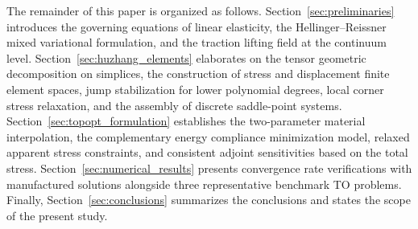 The remainder of this paper is organized as follows. Section~\ref{sec:preliminaries} introduces the governing equations of linear elasticity, the Hellinger--Reissner mixed variational formulation, and the traction lifting field at the continuum level. Section~\ref{sec:huzhang_elements} elaborates on the tensor geometric decomposition on simplices, the construction of stress and displacement finite element spaces, jump stabilization for lower polynomial degrees, local corner stress relaxation, and the assembly of discrete saddle-point systems. Section~\ref{sec:topopt_formulation} establishes the two-parameter material interpolation, the complementary energy compliance minimization model, relaxed apparent stress constraints, and consistent adjoint sensitivities based on the total stress. Section~\ref{sec:numerical_results} presents convergence rate verifications with manufactured solutions alongside three representative benchmark TO problems. Finally, Section~\ref{sec:conclusions} summarizes the conclusions and states the scope of the present study.
